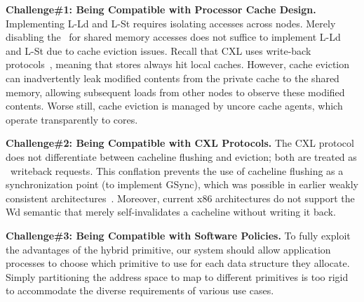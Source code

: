 \noindent \textbf{Challenge\#1: Being Compatible with Processor Cache Design.} 
Implementing L-Ld and L-St requires isolating accesses across nodes. 
Merely disabling the \cxlbi~for shared memory accesses does not suffice to implement L-Ld and L-St due to cache eviction issues. Recall that CXL uses write-back protocols~\cite{cxl-shortdoc, cxl-doc}, meaning that stores always hit local caches. However, cache eviction can inadvertently leak modified contents from the private cache to the shared memory, allowing subsequent loads from other nodes to observe these modified contents. 
Worse still, cache eviction is managed by uncore cache agents, which operate transparently to cores.

\noindent \textbf{Challenge\#2: Being Compatible with CXL Protocols.} The CXL protocol does not differentiate between cacheline flushing and eviction; both are treated as \cxlmem~writeback requests. This conflation prevents the use of cacheline flushing as a synchronization point (to implement GSync), which was possible in earlier weakly consistent architectures~\cite{rvweak_pact17, rvweak_isca18, spandex_asplos18, lrcgpu_micro16}. Moreover, current x86 architectures do not support the Wd semantic that merely self-invalidates a cacheline without writing it back.

\noindent \textbf{Challenge\#3: Being Compatible with Software Policies.} To fully exploit the advantages of the hybrid primitive, our system should allow application processes to choose which primitive to use for each data structure they allocate. Simply partitioning the address space to map to different primitives is too rigid to accommodate the diverse requirements of various use cases.




